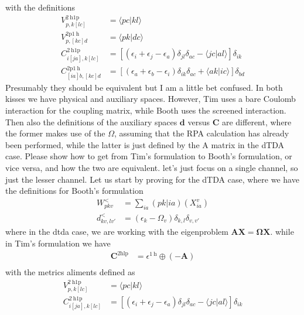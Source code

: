 with the definitions
\begin{align}
    V_{p, k[l c]}^{2 \mathrm{~h} 1 \mathrm{p}} &= \langle p c | k l \rangle \\
    V_{p,[k c] d}^{2 \mathrm{p} 1 \mathrm{~h}} &= \langle p k | d c \rangle \\
    C_{i[j a], k[l c]}^{2 \mathrm{~h} 1 \mathrm{p}} &= \left[\left(\epsilon_i+\epsilon_j-\epsilon_a\right) \delta_{j l} \delta_{a c}-\langle j c | a l \rangle\right] \delta_{i k} \\
    C_{[i a] b,[k c] d}^{2 \mathrm{p} 1 \mathrm{~h}} &= \left[\left(\epsilon_a+\epsilon_b-\epsilon_i\right) \delta_{i k} \delta_{a c}+\langle a k | i c\rangle\right] \delta_{b d}
\end{align}
Presumably they should be equivalent but I am a little bet confused. In both kisses we have physical and auxiliary spaces. However, Tim uses a bare Coulomb interaction for the coupling matrix, while Booth uses the screened interaction. Then also the definitions of the auxiliary spaces $\bm{d}$ versus $\bm{C}$ are different, where the former makes use of the $\Omega $, assuming that the RPA calculation has already been performed, while the latter is just defined by the A matrix in the dTDA case.  Please show how to get from Tim's formulation to Booth's formulation, or vice versa, and how the two are equivalent. let's just focus on a single channel, so just the lesser channel. Let us start by proving for the dTDA case, where we have the definitions for Booth's formulation
\begin{align}
    W_{pkv}^{<} &= \sum_{ia} (pk|ia) \left( X_{ia}^{v} \right) \\
    d_{kv,lv'}^{<} &= \left(\epsilon_k - \Omega_v\right) \delta_{k,l} \delta_{v,v'}
\end{align}
where in the dtda case, we are working with the eigenproblem $\bm{A}\bm{X} = \bm{\Omega }\bm{X}$.
while in Tim's formulation we have
\begin{align}
    \bm{C}^{2 \mathrm{hlp}} &= \epsilon^{1 \mathrm{~h}} \oplus (-\bm{A}) \\
\end{align}
with the metrics aliments defined as
\begin{align}
    V_{p, k[l c]}^{2 \mathrm{~h} 1 \mathrm{p}} &= \langle p c | k l \rangle \\
    C_{i[j a], k[l c]}^{2 \mathrm{~h} 1 \mathrm{p}} &= \left[\left(\epsilon_i+\epsilon_j-\epsilon_a\right) \delta_{j l} \delta_{a c}-\langle j c | a l \rangle\right] \delta_{i k}
\end{align}
